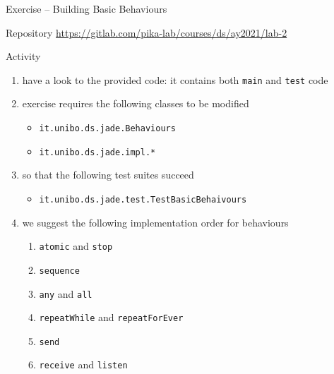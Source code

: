 \documentclass{beamer}\mode<presentation>{\usetheme{AMSCesenaPurpleAndGold}}
\begin{document}
\begin{frame}[c,allowframebreaks]{Exercise \currentExercise{} -- Building Basic Behaviours}

    \begin{block}{Repository}\centering
        \url{https://gitlab.com/pika-lab/courses/ds/ay2021/lab-2}
    \end{block}

    \bigskip

    Activity
    \medskip
    \begin{enumerate}
        \item have a look to the provided code: it contains both \texttt{main} and \texttt{test} code

        \medskip

        \item exercise \currentExercise{} requires the following classes to be modified
        \begin{itemize}
            \item \texttt{it.unibo.ds.jade.\alert{Behaviours}}
            \item \texttt{it.unibo.ds.jade.\alert{impl.*}}
        \end{itemize}

        \medskip

        \item so that the following test suites succeed
        \begin{itemize}
            \item \texttt{it.unibo.ds.jade.test.\alert{TestBasicBehaivours}}
        \end{itemize}

        \framebreak

        \item we suggest the following implementation order for behaviours
        \begin{enumerate}
            \item \texttt{atomic} and \texttt{stop}
            \item \texttt{sequence}
            \item \texttt{any} and \texttt{all}
            \item \texttt{repeatWhile} and \texttt{repeatForEver}
            \item \texttt{send}
            \item \texttt{receive} and \texttt{listen}
        \end{enumerate}


\end{enumerate}
\end{frame}
\end{document}
